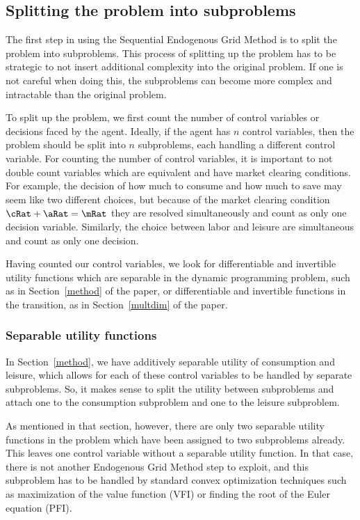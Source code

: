 \documentclass{article}
\begin{document}
\subsection{Splitting the problem into subproblems}

The first step in using the Sequential Endogenous Grid Method is to split the problem into subproblems. This process of splitting up the problem has to be strategic to not insert additional complexity into the original problem. If one is not careful when doing this, the subproblems can become more complex and intractable than the original problem.

To split up the problem, we first count the number of control variables or decisions faced by the agent. Ideally, if the agent has $n$ control variables, then the problem should be split into $n$ subproblems, each handling a different control variable. For counting the number of control variables, it is important to not double count variables which are equivalent and have market clearing conditions. For example, the decision of how much to consume and how much to save may seem like two different choices, but because of the market clearing condition $\cRat + \aRat = \mRat$ they are resolved simultaneously and count as only one decision variable. Similarly, the choice between labor and leisure are simultaneous and count as only one decision.

Having counted our control variables, we look for differentiable and invertible utility functions which are separable in the dynamic programming problem, such as in Section~\ref{method} of the paper, or differentiable and invertible functions in the transition, as in Section~\ref{multdim} of the paper.


\subsubsection{Separable utility functions}

In Section~\ref{method}, we have additively separable utility of consumption and leisure, which allows for each of these control variables to be handled by separate subproblems. So, it makes sense to split the utility between subproblems and attach one to the consumption subproblem and one to the leisure subproblem.

As mentioned in that section, however, there are only two separable utility functions in the problem which have been assigned to two subproblems already. This leaves one control variable without a separable utility function. In that case, there is not another Endogenous Grid Method step to exploit, and this subproblem has to be handled by standard convex optimization techniques such as maximization of the value function (VFI) or finding the root of the Euler equation (PFI).
\end{document}

